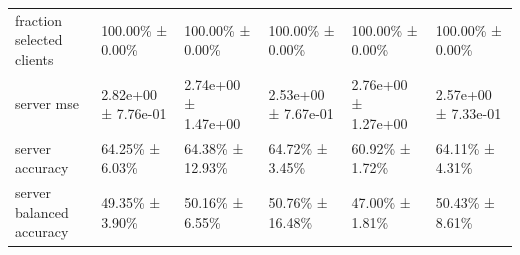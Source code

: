 \begin{tabular}{llllll}
 fraction selected clients          & 100.00\% ± 0.00\%     & 100.00\% ± 0.00\%     & 100.00\% ± 0.00\%     & 100.00\% ± 0.00\%     & 100.00\% ± 0.00\%     \\
 server mse                         & 2.82e+00 ± 7.76e-01 & 2.74e+00 ± 1.47e+00 & 2.53e+00 ± 7.67e-01 & 2.76e+00 ± 1.27e+00 & 2.57e+00 ± 7.33e-01 \\
 server accuracy                    & 64.25\% ± 6.03\%      & 64.38\% ± 12.93\%     & 64.72\% ± 3.45\%      & 60.92\% ± 1.72\%      & 64.11\% ± 4.31\%      \\
 server balanced accuracy           & 49.35\% ± 3.90\%      & 50.16\% ± 6.55\%      & 50.76\% ± 16.48\%     & 47.00\% ± 1.81\%      & 50.43\% ± 8.61\%      \\
\hline
\end{tabular}
